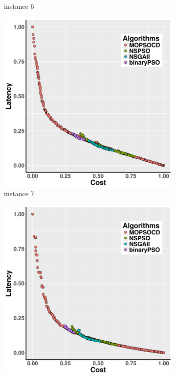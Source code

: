\documentclass[10pt,journal,compsoc]{IEEEtran}
\begin{document}
\begin{figure}[ht]
\begin{subfigure}{0.21\linewidth}
    \caption{instance 6}
   \end{subfigure}
   \begin{subfigure}{0.21\linewidth}
       \includegraphics[width=\textwidth]{pics/total7.png}
    \caption{instance 7}
   \end{subfigure}
      \begin{subfigure}{0.21\linewidth}
       \includegraphics[width=\textwidth]{pics/total8.png}

\end{subfigure}
\end{figure}
\end{document}

